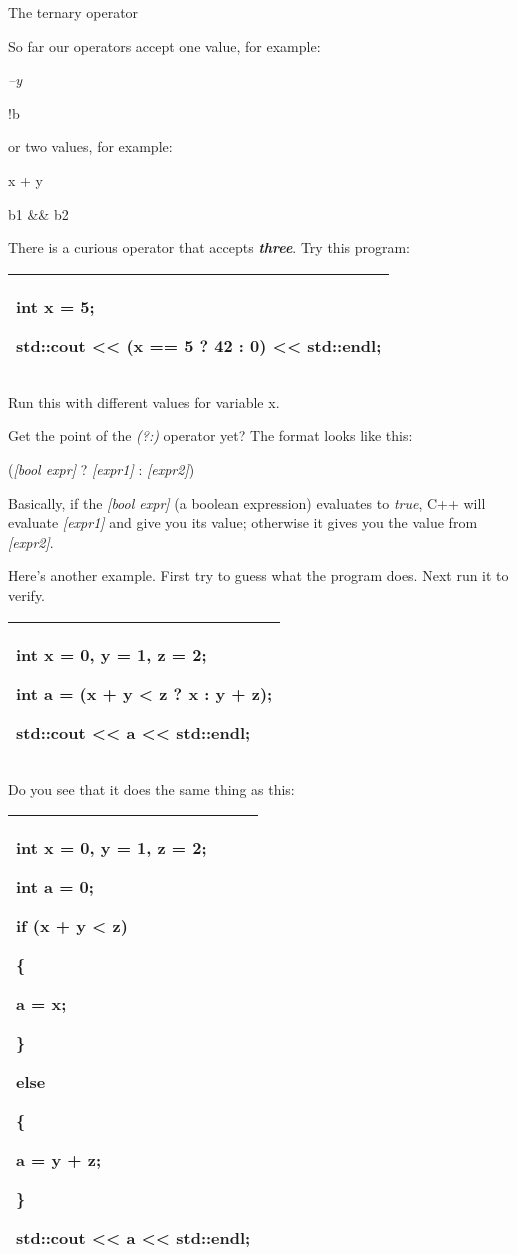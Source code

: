 \documentclass[
]{article}
\begin{document}
The ternary operator

So far our operators accept one value, for example:

\emph{--y}

!b

or two values, for example:

x + y

b1 \&\& b2

There is a curious operator that accepts \emph{\textbf{three}}. Try this
program:

\begin{longtable}[]{@{}l@{}}
\toprule
\endhead
\begin{minipage}[t]{0.97\columnwidth}\raggedright
int x = 5;

std::cout \textless\textless{} (x == 5 ? 42 : 0) \textless\textless{}
std::endl;\strut
\end{minipage}\tabularnewline
\bottomrule
\end{longtable}

Run this with different values for variable x.

Get the point of the \emph{(?:)} operator yet? The format looks like
this:

(\emph{{[}bool expr{]}} ? \emph{{[}expr1{]}} : \emph{{[}expr2{]}})

Basically, if the \emph{{[}bool expr{]}} (a boolean expression)
evaluates to \emph{true}, C++ will evaluate \emph{{[}expr1{]}} and give
you its value; otherwise it gives you the value from \emph{{[}expr2{]}}.

Here's another example. First try to guess what the program does. Next
run it to verify.

\begin{longtable}[]{@{}l@{}}
\toprule
\endhead
\begin{minipage}[t]{0.97\columnwidth}\raggedright
int x = 0, y = 1, z = 2;

int a = (x + y \textless{} z ? x : y + z);

std::cout \textless\textless{} a \textless\textless{} std::endl;\strut
\end{minipage}\tabularnewline
\bottomrule
\end{longtable}

Do you see that it does the same thing as this:

\begin{longtable}[]{@{}l@{}}
\toprule
\endhead
\begin{minipage}[t]{0.97\columnwidth}\raggedright
int x = 0, y = 1, z = 2;

int a = 0;

if (x + y \textless{} z)

\{

a = x;

\}

else

\{

a = y + z;

\}

std::cout \textless\textless{} a \textless\textless{} std::endl;\strut
\end{minipage}\tabularnewline
\bottomrule
\end{longtable}
\end{document}
